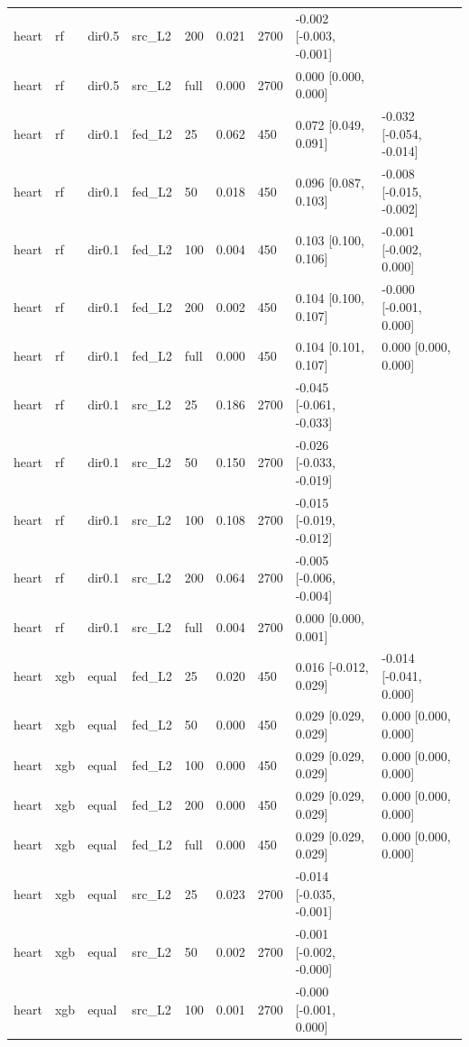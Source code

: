 \begin{tabular}{lllllllll}
heart & rf & dir0.5 & src\_L2 & 200 & 0.021 & 2700 & -0.002 [-0.003, -0.001] &  \\
heart & rf & dir0.5 & src\_L2 & full & 0.000 & 2700 & 0.000 [0.000, 0.000] &  \\
heart & rf & dir0.1 & fed\_L2 & 25 & 0.062 & 450 & 0.072 [0.049, 0.091] & -0.032 [-0.054, -0.014] \\
heart & rf & dir0.1 & fed\_L2 & 50 & 0.018 & 450 & 0.096 [0.087, 0.103] & -0.008 [-0.015, -0.002] \\
heart & rf & dir0.1 & fed\_L2 & 100 & 0.004 & 450 & 0.103 [0.100, 0.106] & -0.001 [-0.002, 0.000] \\
heart & rf & dir0.1 & fed\_L2 & 200 & 0.002 & 450 & 0.104 [0.100, 0.107] & -0.000 [-0.001, 0.000] \\
heart & rf & dir0.1 & fed\_L2 & full & 0.000 & 450 & 0.104 [0.101, 0.107] & 0.000 [0.000, 0.000] \\
heart & rf & dir0.1 & src\_L2 & 25 & 0.186 & 2700 & -0.045 [-0.061, -0.033] &  \\
heart & rf & dir0.1 & src\_L2 & 50 & 0.150 & 2700 & -0.026 [-0.033, -0.019] &  \\
heart & rf & dir0.1 & src\_L2 & 100 & 0.108 & 2700 & -0.015 [-0.019, -0.012] &  \\
heart & rf & dir0.1 & src\_L2 & 200 & 0.064 & 2700 & -0.005 [-0.006, -0.004] &  \\
heart & rf & dir0.1 & src\_L2 & full & 0.004 & 2700 & 0.000 [0.000, 0.001] &  \\
heart & xgb & equal & fed\_L2 & 25 & 0.020 & 450 & 0.016 [-0.012, 0.029] & -0.014 [-0.041, 0.000] \\
heart & xgb & equal & fed\_L2 & 50 & 0.000 & 450 & 0.029 [0.029, 0.029] & 0.000 [0.000, 0.000] \\
heart & xgb & equal & fed\_L2 & 100 & 0.000 & 450 & 0.029 [0.029, 0.029] & 0.000 [0.000, 0.000] \\
heart & xgb & equal & fed\_L2 & 200 & 0.000 & 450 & 0.029 [0.029, 0.029] & 0.000 [0.000, 0.000] \\
heart & xgb & equal & fed\_L2 & full & 0.000 & 450 & 0.029 [0.029, 0.029] & 0.000 [0.000, 0.000] \\
heart & xgb & equal & src\_L2 & 25 & 0.023 & 2700 & -0.014 [-0.035, -0.001] &  \\
heart & xgb & equal & src\_L2 & 50 & 0.002 & 2700 & -0.001 [-0.002, -0.000] &  \\
heart & xgb & equal & src\_L2 & 100 & 0.001 & 2700 & -0.000 [-0.001, 0.000] &  \\

\end{tabular}
